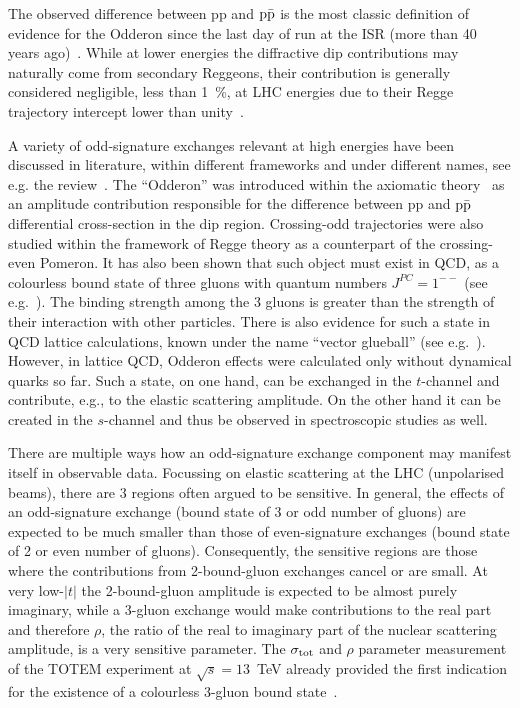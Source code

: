 \documentclass[TOTEM]{cernphprep}
\begin{document}
The observed difference between pp and $\rm p\bar{p}$ is the most classic definition of evidence for the Odderon since the last day of run at the ISR (more than 40 years ago)~\cite{Breakstone:1985pe,Breakstone:1984te,Amaldi:1979kd}.
While at lower energies the diffractive dip contributions may naturally come from secondary Reggeons, their contribution is generally considered negligible, less than 1~\%, at LHC energies due to their Regge trajectory intercept
lower than unity~\cite{Jenkovszky:2017efs}.

A variety of odd-signature exchanges relevant at high energies have been discussed in literature, within different frameworks and under different names, see e.g. the review~\cite{Ewerz:2005rg}.
The ``Odderon'' was introduced within
the axiomatic theory~\cite{Gauron:1992zc} as an amplitude contribution responsible for the difference between pp and $\rm p\bar{p}$
differential cross-section in the dip region. Crossing-odd trajectories were also studied
within the framework of Regge theory as a counterpart of the crossing-even Pomeron.  It has also been shown
that such object must exist in QCD, as a colourless bound state of three gluons with quantum numbers $J^{PC}=1^{--}$ (see e.g.~\cite{Bartels:1999yt}).
The binding strength among the 3 gluons is greater than the strength of their interaction with other particles. There is also
evidence for such a state in QCD lattice calculations, known under the name  “vector glueball” (see e.g.~\cite{Morningstar:1999rf}).
However, in lattice QCD, Odderon effects were calculated only without dynamical quarks so far.
Such a state, on one hand, can be exchanged in the $t$-channel and contribute, e.g., to the elastic scattering amplitude.
On the other hand it can be created in the $s$-channel and thus be observed in spectroscopic studies as well.

There are multiple ways how an odd-signature exchange component may manifest itself in observable data.  Focussing on elastic scattering at
the LHC (unpolarised beams), there are 3 regions often argued to be sensitive.  In general, the effects of an
odd-signature exchange (bound state of 3 or odd number of gluons) are expected to be much smaller than those of even-signature exchanges (bound state of 2 or even number of gluons).
Consequently, the sensitive regions are those where the contributions from 2-bound-gluon exchanges cancel or are small.  At very
low-$|t|$ the 2-bound-gluon amplitude is expected to be almost purely imaginary, while a 3-gluon exchange would make contributions
to the real part and therefore $\rho$, the ratio of the real to imaginary part of the nuclear scattering amplitude, is a very sensitive parameter. The $\sigma_{\rm tot}$ and $\rho$ parameter measurement of the TOTEM experiment at $\sqrt{s}=13$~TeV already provided the first indication for
the existence of a colourless 3-gluon bound state~\cite{Antchev:2017dia,Antchev:2298154}.
\end{document}
